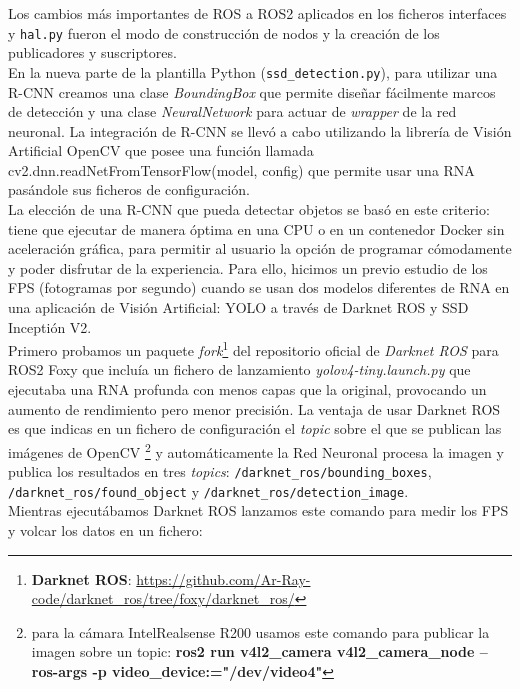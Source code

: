 Los cambios más importantes de ROS a ROS2 aplicados en los ficheros interfaces y \texttt{hal.py} fueron el modo de construcción de nodos y la creación de los publicadores y suscriptores.\\

En la nueva parte de la plantilla Python (\texttt{ssd\_detection.py}), para utilizar una R-CNN creamos una clase \textit{BoundingBox} que permite diseñar fácilmente marcos de detección y una clase \textit{NeuralNetwork} para actuar de \textit{wrapper} de la red neuronal. La integración de R-CNN se llevó a cabo utilizando la librería de Visión Artificial OpenCV que posee una función llamada cv2.dnn.readNetFromTensorFlow(model, config) que permite usar una RNA pasándole sus ficheros de configuración.\\

La elección de una R-CNN que pueda detectar objetos se basó en este criterio: tiene que ejecutar de manera óptima en una CPU o en un contenedor Docker sin aceleración gráfica, para permitir al usuario la opción de programar cómodamente y poder disfrutar de la experiencia. Para ello, hicimos un previo estudio de los FPS (fotogramas por segundo) cuando se usan dos modelos diferentes de RNA en una aplicación de Visión Artificial: YOLO a través de Darknet ROS y SSD Inceptión V2.\\

Primero probamos un paquete \textit{fork}\footnote{\textbf{Darknet ROS}: \url{https://github.com/Ar-Ray-code/darknet_ros/tree/foxy/darknet_ros/}} del repositorio oficial de \textit{Darknet ROS} para ROS2 Foxy que incluía un fichero de lanzamiento \textit{yolov4-tiny.launch.py} que ejecutaba una RNA profunda con menos capas que la original, provocando un aumento de rendimiento pero menor precisión. La ventaja de usar Darknet ROS es que indicas en un fichero de configuración el \textit{topic} sobre el que se publican las imágenes de OpenCV \footnote{para la cámara IntelRealsense R200 usamos este comando para publicar la imagen sobre un topic: \textbf{ros2 run v4l2\_camera v4l2\_camera\_node --ros-args -p video\_device:="/dev/video4"}} y automáticamente la Red Neuronal procesa la imagen y publica los resultados en tres \textit{topics}: \texttt{/darknet\_ros/bounding\_boxes}, \texttt{/darknet\_ros/found\_object} y \texttt{/darknet\_ros/detection\_image}.\\

Mientras ejecutábamos Darknet ROS lanzamos este comando para medir los FPS y volcar los datos en un fichero:\\

